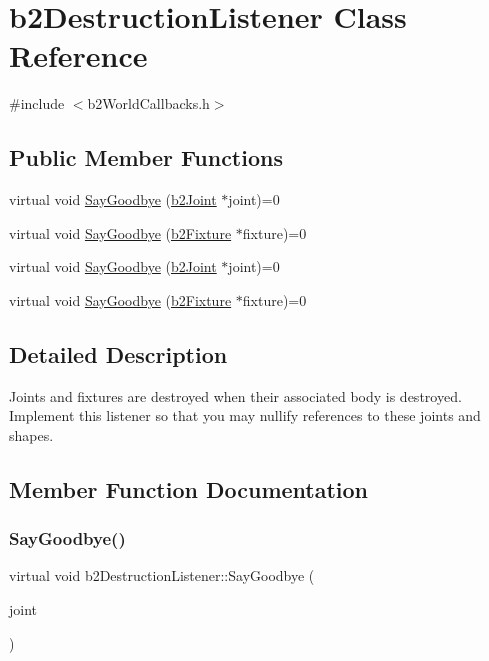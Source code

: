 \hypertarget{classb2DestructionListener}{}\section{b2\+Destruction\+Listener Class Reference}
\label{classb2DestructionListener}


{\ttfamily \#include $<$b2\+World\+Callbacks.\+h$>$}

\subsection*{Public Member Functions}
\begin{DoxyCompactItemize}
\item 
virtual void \hyperlink{classb2DestructionListener_a6cd15baa6e5c33118cf7173ab5bf6d58}{Say\+Goodbye} (\hyperlink{classb2Joint}{b2\+Joint} $\ast$joint)=0
\item 
virtual void \hyperlink{classb2DestructionListener_ab327c0073d162112c38d2fe8f8b9fce3}{Say\+Goodbye} (\hyperlink{classb2Fixture}{b2\+Fixture} $\ast$fixture)=0
\item 
virtual void \hyperlink{classb2DestructionListener_a6cd15baa6e5c33118cf7173ab5bf6d58}{Say\+Goodbye} (\hyperlink{classb2Joint}{b2\+Joint} $\ast$joint)=0
\item 
virtual void \hyperlink{classb2DestructionListener_ab327c0073d162112c38d2fe8f8b9fce3}{Say\+Goodbye} (\hyperlink{classb2Fixture}{b2\+Fixture} $\ast$fixture)=0
\end{DoxyCompactItemize}


\subsection{Detailed Description}
Joints and fixtures are destroyed when their associated body is destroyed. Implement this listener so that you may nullify references to these joints and shapes. 

\subsection{Member Function Documentation}
\mbox{\label{classb2DestructionListener_a6cd15baa6e5c33118cf7173ab5bf6d58}} 
\subsubsection{\texorpdfstring{Say\+Goodbye()}{SayGoodbye()}\hspace{0.1cm}{\footnotesize\ttfamily [1/4]}}
{\footnotesize\ttfamily virtual void b2\+Destruction\+Listener\+::\+Say\+Goodbye (\begin{DoxyParamCaption}\item[{\hyperlink{classb2Joint}{b2\+Joint} $\ast$}]{joint }\end{DoxyParamCaption})\hspace{0.3cm}{\ttfamily [pure virtual]}}

